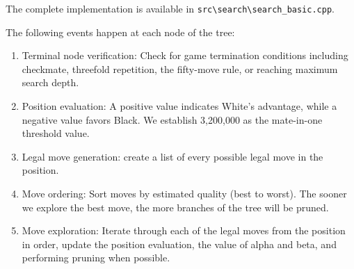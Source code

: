 \vspace{1em}

\noindent \parbox{\textwidth}{The complete implementation is available in \texttt{src\textbackslash{}search\textbackslash{}search\_basic.cpp}.}

\vspace{1em}

\noindent The following events happen at each node of the tree:

\begin{enumerate}
    \item Terminal node verification: Check for game termination conditions including checkmate, threefold repetition, the fifty-move rule, or reaching maximum search depth.
    \item Position evaluation: A positive value indicates White's advantage, while a negative value favors Black. We establish 3,200,000 as the mate-in-one threshold value.
    \item Legal move generation: create a list of every possible legal move in the position.
    \item Move ordering: Sort moves by estimated quality (best to worst). The sooner we explore the best move, the more branches of the tree will be pruned.
    \item Move exploration: Iterate through each of the legal moves from the position in order, update the position evaluation, the value of alpha and beta, and performing pruning when possible.
\end{enumerate}

